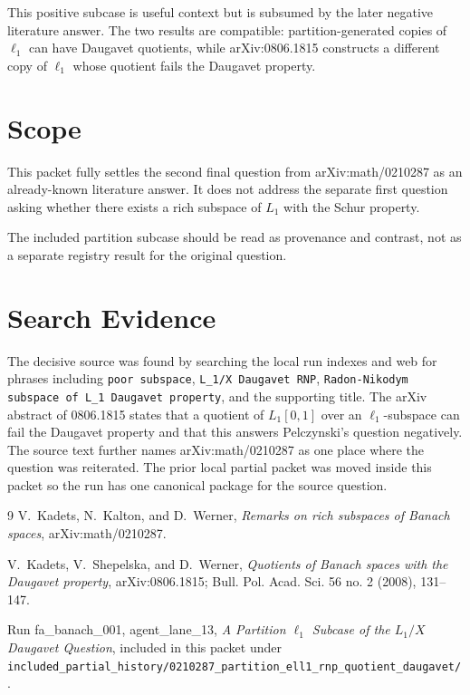 \documentclass[11pt]{article}
\begin{document}
This positive subcase is useful context but is subsumed by the later negative
literature answer.  The two results are compatible: partition-generated copies
of \(\ell_1\) can have Daugavet quotients, while arXiv:0806.1815 constructs a
different copy of \(\ell_1\) whose quotient fails the Daugavet property.

\section*{Scope}

This packet fully settles the second final question from arXiv:math/0210287 as
an already-known literature answer.  It does not address the separate first
question asking whether there exists a rich subspace of \(L_1\) with the Schur
property.

The included partition subcase should be read as provenance and contrast, not
as a separate registry result for the original question.

\section*{Search Evidence}

The decisive source was found by searching the local run indexes and web for
phrases including \texttt{poor subspace}, \texttt{L\_1/X Daugavet RNP},
\texttt{Radon-Nikodym subspace of L\_1 Daugavet property}, and the supporting
title.  The arXiv abstract of 0806.1815 states that a quotient of \(L_1[0,1]\)
over an \(\ell_1\)-subspace can fail the Daugavet property and that this answers
Pelczynski's question negatively.  The source text further names
arXiv:math/0210287 as one place where the question was reiterated.  The prior
local partial packet was moved inside this packet so the run has one canonical
package for the source question.

\begin{thebibliography}{9}
V.~Kadets, N.~Kalton, and D.~Werner,
\emph{Remarks on rich subspaces of Banach spaces},
arXiv:math/0210287.

V.~Kadets, V.~Shepelska, and D.~Werner,
\emph{Quotients of Banach spaces with the Daugavet property},
arXiv:0806.1815; Bull. Pol. Acad. Sci. 56 no. 2 (2008), 131--147.

Run fa\_banach\_001, agent\_lane\_13,
\emph{A Partition \(\ell_1\) Subcase of the \(L_1/X\) Daugavet Question},
included in this packet under
\texttt{included\_partial\_history/0210287\_partition\_ell1\_rnp\_quotient\_daugavet/}.
\end{thebibliography}
\end{document}
